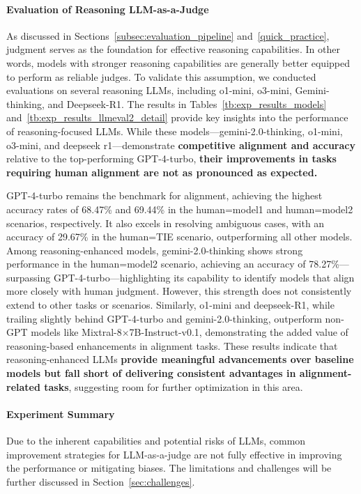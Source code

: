 \documentclass[acmsmall,screen]{acmart}
\begin{document}
\paragraph{\textbf{Evaluation of Reasoning LLM-as-a-Judge}}
\label{subsec:evaluation_of_reasoning_model}
As discussed in Sections~\ref{subsec:evaluation_pipeline} and~\ref{quick_practice}, judgment serves as the foundation for effective reasoning capabilities. In other words, models with stronger reasoning capabilities are generally better equipped to perform as reliable judges. To validate this assumption, we conducted evaluations on several reasoning LLMs, including o1-mini, o3-mini, Gemini-thinking, and Deepseek-R1. 
The results in Tables~\ref{tb:exp_results_models} and~\ref{tb:exp_results_llmeval2_detail} provide key insights into the performance of reasoning-focused LLMs. While these models—gemini-2.0-thinking, o1-mini, o3-mini, and deepseek r1—demonstrate \textbf{competitive alignment and accuracy} relative to the top-performing GPT-4-turbo, \textbf{their improvements in tasks requiring human alignment are not as pronounced as expected.}



GPT-4-turbo remains the benchmark for alignment, achieving the highest accuracy rates of 68.47\% and 69.44\% in the human=model1 and human=model2 scenarios, respectively. It also excels in resolving ambiguous cases, with an accuracy of 29.67\% in the human=TIE scenario, outperforming all other models. 
Among reasoning-enhanced models, gemini-2.0-thinking shows strong performance in the human=model2 scenario, achieving an accuracy of 78.27\%—surpassing GPT-4-turbo—highlighting its capability to identify models that align more closely with human judgment. However, this strength does not consistently extend to other tasks or scenarios. Similarly, o1-mini and deepseek-R1, while trailing slightly behind GPT-4-turbo and gemini-2.0-thinking, outperform non-GPT models like Mixtral-8$\times$7B-Instruct-v0.1, demonstrating the added value of reasoning-based enhancements in alignment tasks.
These results indicate that reasoning-enhanced LLMs \textbf{provide meaningful advancements over baseline models but fall short of delivering consistent advantages in alignment-related tasks}, suggesting room for further optimization in this area.




\paragraph{\textbf{Experiment Summary}}
Due to the inherent capabilities and potential risks of LLMs, common improvement strategies for LLM-as-a-judge are not fully effective in improving the performance or mitigating biases. The limitations and challenges will be further discussed in Section~\ref{sec:challenges}. 
\end{document}
